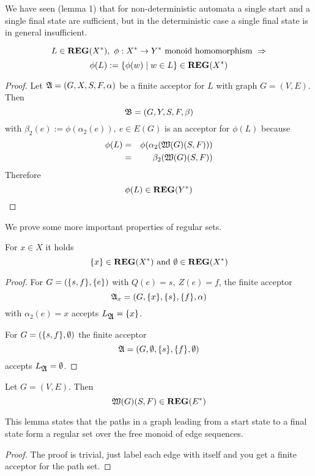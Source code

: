 We have seen (lemma 1) that for non-deterministic automata a single start and a
single final state are sufficient, but in the deterministic case a single final
state is in general insufficient.

\bigskip
\begin{theorem}
\[ L \in \mbox{{\bf REG}}(X^*),\ \phi : X^* \to Y^* \text{ monoid homomorphism }
\Rightarrow \]
\[ \phi(L) := \mbox{$\{\phi(w) \mid w \in L\}$} \in \mbox{{\bf REG}}(X^*) \]
\end{theorem}
\begin{proof}
Let $\mbox{$\mathfrak{A}$} = (G, X, S, F, \alpha)$ be a finite acceptor for $L$ with graph $G
= (V, E)$. Then
\[ \mbox{$\mathfrak{B}$} = (G, Y, S, F, \beta) \]
with $\beta_2(e) := \phi(\alpha_2(e)),\ e \in E(G)$ is an acceptor for $\phi(L)$
because
\begin{eqnarray*}
\phi(L) &=& \phi(\alpha_2(\mbox{$\mathfrak{W}({G})$}(S, F))) \\
        &=& \beta_2(\mbox{$\mathfrak{W}({G})$}(S,F))
\end{eqnarray*}
Therefore \[ \phi(L) \in \mbox{{\bf REG}}(Y^*) \]
\end{proof}

\bigskip
We prove some more important properties of regular sets.

\begin{lemma}
For $x \in X$ it holds
\[ \mbox{$\{x\}$} \in \mbox{{\bf REG}}(X^*)\text{ and }\emptyset \in \mbox{{\bf REG}}(X^*) \]
\end{lemma}

\begin{proof}
For $G = (\mbox{$\{s, f\}$}, \mbox{$\{e\}$})$ with $Q(e)=s,\ Z(e)=f$, the finite acceptor
\[\mbox{$\mathfrak{A}$}_x = (G, \mbox{$\{x\}$}, \mbox{$\{s\}$}, \mbox{$\{f\}$}, \alpha)\]
with $\alpha_2(e) = x$ accepts $L_{\mbox{$\mathfrak{A}$}} = \mbox{$\{x\}$}$.

For $G = (\mbox{$\{s, f\}$}, \emptyset)$ the finite acceptor 
\[ \mbox{$\mathfrak{A}$} = (G, \emptyset, \mbox{$\{s\}$}, \mbox{$\{f\}$}, \emptyset) \]
accepts $L_{\mbox{$\mathfrak{A}$}} = \emptyset$.
\end{proof}

\bigskip
\begin{lemma}
Let $G = (V, E)$. Then
\[ \mbox{$\mathfrak{W}({G})$}(S, F) \in \mbox{{\bf REG}}(E^*) \]
\end{lemma}

This lemma states that the paths in a graph leading from a start state to a
final state form a regular set over the free monoid of edge sequences.
 
\begin{proof}
The proof is trivial, just label each edge with itself and you get a finite
acceptor for the path set.
\end{proof}

